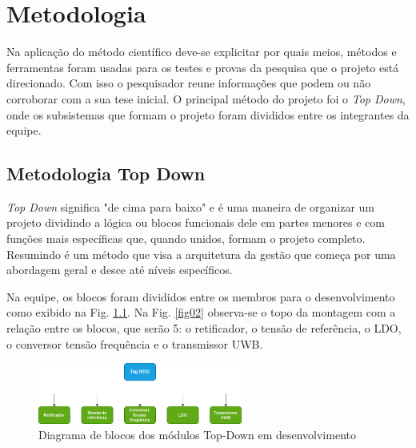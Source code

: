 
\chapter[Metodologia]{Metodologia}

Na aplicação do método científico deve-se explicitar por quais meios, métodos e ferramentas foram usadas para os testes e provas da pesquisa que o projeto está direcionado. Com isso o pesquisador reune informações que podem ou não corroborar com a sua tese inicial. O principal método do projeto foi o \textit{Top Down}, onde os subsistemas que formam o projeto foram divididos entre os integrantes da equipe.

\section{Metodologia Top Down}

\textit{Top Down} significa "de cima para baixo" e é uma maneira de organizar um projeto dividindo a lógica ou blocos funcionais dele em partes menores e com funções mais específicas que, quando unidos, formam o projeto completo. Resumindo é um método que visa a arquitetura da gestão que começa por uma abordagem geral e desce até níveis específicos.\cite{site_top_down}

Na equipe, os blocos foram divididos entre os membros para o  desenvolvimento como exibido na Fig. \ref{fig03}. Na Fig. \ref{fig02} observa-se o topo da montagem com a relação entre os blocos, que serão 5: o retificador, o tensão de referência, o LDO, o conversor tensão frequência e o transmissor UWB.

\begin{figure}[htb]
	\centering
	\includegraphics[width=0.6\textwidth]{figuras/diagrama.png}
	\caption{Diagrama de blocos dos módulos Top-Down em desenvolvimento}
	\label{fig03}
\end{figure}



